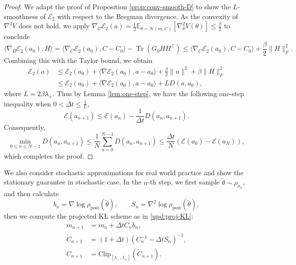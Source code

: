 \documentclass[11pt]{article}
\theoremstyle{plain}
\theoremstyle{definition}
\theoremstyle{remark}
\newcommand{\N}{\mathcal{N}}
\newcommand{\E}{\mathbb{E}}
\newcommand{\Tr}{\operatorname{Tr}}
\newcommand{\post}{\mathrm{post}}
\newcommand{\Clip}{\mathrm{Clip}}
\begin{document}
\begin{proof}
    We adapt the proof of Proposition \ref{prop:conv-smooth-D} to show the $L$-smoothness of $\mathcal{E}_2$ with respect to the Bregman divergence. As the convexity of $\nabla^2 V$ does not hold, we apply $\nabla_C \mathcal{E}_2 (a) = \frac{1}{2} \E_{\theta \sim \N (m, C)} [\nabla_\theta^2 V(\theta)] \leq \frac{\beta}{2}$ to conclude
    \begin{equation*}
        \langle \nabla_B \mathcal{E}_2 (a_0), H\rangle = \langle \nabla_C \mathcal{E}_2 (a_0), C - C_0 \rangle - \Tr (G_0 HH^\top) \leq  \langle \nabla_C \mathcal{E}_2 (a_0), C - C_0 \rangle + \frac{\beta}{2} \|H\|_F^2.
    \end{equation*}
    Combining this with the Taylor bound, we obtain
    \begin{align*}
        \mathcal{E}_2 (a) &\leq \mathcal{E}_2 (a_0) + \langle \nabla \mathcal{E}_2 (a_0), a - a_0 \rangle + \frac{\beta}{2} \|u\|^2 + \beta \|H\|_F^2 \\
        &\leq \mathcal{E}_2 (a_0) + \langle \nabla \mathcal{E}_2 (a_0), a - a_0 \rangle + LD(a, a_0),
    \end{align*}
    where $L = 2\beta\lambda_+$. Thus by Lemma \ref{lem:one-step}, we have the following one-step inequality when $0 < \Delta t \leq \frac{1}{L}$,
    \begin{equation*}
        \mathcal{E} (a_{n+1}) \leq \mathcal{E} (a_n) - \frac{1}{\Delta t} D(a_n, a_{n+1}).
    \end{equation*}
    Consequently,
    \begin{equation*}
        \min_{0 \leq n \leq N - 1} D(a_n, a_{n+1}) \leq \frac{1}{N} \sum_{n=0}^{N - 1} D (a_n, a_{n+1}) \leq \frac{\Delta t}{N} (\mathcal{E} (a_0) - \mathcal{E} (a_N)),
    \end{equation*}
    which completes the proof.
\end{proof}

We also consider stochastic approximations for real world practice and show the stationary guarantee in stochastic case. In the $n$-th step, we first sample $\tilde\theta \sim \rho_{a_n}$, and then calculate
\begin{equation*}
    b_n = \nabla \log \rho_\post (\tilde \theta), \qquad S_n = \nabla^2 \log \rho_\post (\tilde\theta),
\end{equation*}
then we compute the projected KL scheme as in \eqref{upd:proj-KL}:
\begin{equation}\label{upd:proj-KL-stoch}
    \begin{aligned}
        m_{n+1} &= m_n + \Delta t C_n b_n, \\
        \widetilde{C}_{n+1} &= (1 + \Delta t) (C_n^{-1} - \Delta t S_n)^{-1}, \\
        C_{n+1} &= \Clip_{[\lambda_-, \lambda_+]} (\widetilde{C}_{n+1}).
    \end{aligned}
\end{equation}
\end{document}
